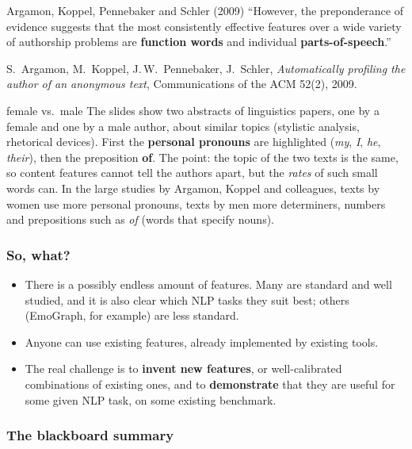 \begin{nbfact}{Argamon, Koppel, Pennebaker and Schler (2009)}
``However, the preponderance of evidence suggests that the most consistently effective
features over a wide variety of authorship problems are \textbf{function words} and
individual \textbf{parts-of-speech}.''

\smallskip\noindent
{\footnotesize S.\ Argamon, M.\ Koppel, J.\,W.\ Pennebaker, J.\ Schler,
\emph{Automatically profiling the author of an anonymous text}, Communications of the
ACM 52(2), 2009.}
\end{nbfact}

\begin{nbexample}{female vs.\ male}
The slides show two abstracts of linguistics papers, one by a female and one by a male
author, about similar topics (stylistic analysis, rhetorical devices). First the
\textbf{personal pronouns} are highlighted (\emph{my}, \emph{I}, \emph{he},
\emph{their}), then the preposition \textbf{of}. The point: the topic of the two texts
is the same, so content features cannot tell the authors apart, but the \emph{rates} of
such small words can. In the large studies by Argamon, Koppel and colleagues, texts by
women use more personal pronouns, texts by men more determiners, numbers and
prepositions such as \emph{of} (words that specify nouns).
\end{nbexample}

\subsubsection{So, what?}

\begin{itemize}[nosep]
  \item There is a possibly endless amount of features. Many are standard and well
        studied, and it is also clear which NLP tasks they suit best; others (EmoGraph,
        for example) are less standard.
  \item Anyone can use existing features, already implemented by existing tools.
  \item The real challenge is to \textbf{invent new features}, or well-calibrated
        combinations of existing ones, and to \textbf{demonstrate} that they are useful
        for some given NLP task, on some existing benchmark.
\end{itemize}

\subsubsection{The blackboard summary}

